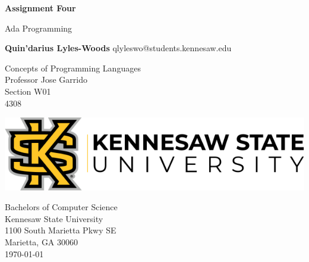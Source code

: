 \begin{titlepage}
\begin{center}
	\vspace*{1cm}

	\Huge
	\textbf{Assignment Four}

	\vspace{0.5cm}
	\LARGE
		Ada Programming	

	\vspace{1.5cm}

	\textbf{Quin'darius Lyles-Woods}
	\Large
	qlyleswo@students.kennesaw.edu

	\vfill
	\LARGE
	Concepts of Programming Languages	\\
	Professor Jose Garrido			\\
	Section W01 				\\
	4308
	\vspace{0.8cm}

	\includegraphics[width=\textwidth]{kennesawlogo}

	\vspace{0.8cm}

	\Large
	Bachelors of Computer Science\\
	Kennesaw State University\\
	1100 South Marietta Pkwy SE\\
	Marietta, GA 30060\\
	\today	

	\vspace{1cm}

\end{center}
\end{titlepage}
